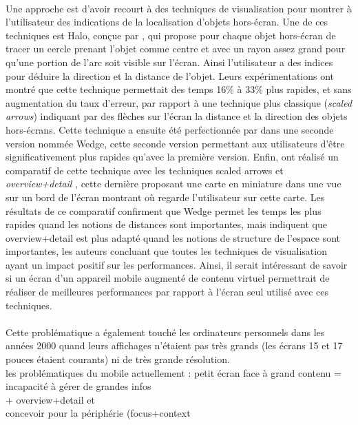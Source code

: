 \paragraph{}
Une approche est d'avoir recourt à des techniques de visualisation pour montrer à l'utilisateur des indications de la localisation d'objets hors-écran. Une de ces techniques est Halo, conçue par \citet{BaudischRosenholtz2003}, qui propose pour chaque objet hors-écran de tracer un cercle prenant l'objet comme centre et avec un rayon assez grand pour qu'une portion de l'arc soit visible sur l'écran. Ainsi l'utilisateur a des indices pour déduire la direction et la distance de l'objet. Leurs expérimentations ont montré que cette technique permettait des temps 16\% à 33\% plus rapides, et sans augmentation du taux d'erreur, par rapport à une technique plus classique (\emph{scaled arrows}) indiquant par des flèches sur l'écran la distance et la direction des objets hors-écrans. Cette technique a ensuite été perfectionnée par \citet{GustafsonBaudischGutwinEtAl2008} dans une seconde version nommée Wedge, cette seconde version permettant aux utilisateurs d'être significativement plus rapides qu'avec la première version. Enfin, \citet{BurigatChittaro2011} ont réalisé un comparatif de cette technique avec les techniques \foreignlanguage{english}{scaled arrows} et \emph{overview+detail} , cette dernière proposant une carte en miniature dans une vue sur un bord de l'écran montrant où regarde l'utilisateur sur cette carte. Les résultats de ce comparatif confirment que Wedge permet les temps les plus rapides quand les notions de distances sont importantes, mais indiquent que overview+detail est plus adapté quand les notions de structure de l'espace sont importantes, les auteurs concluant que toutes les techniques de visualisation ayant un impact positif sur les performances. Ainsi, il serait intéressant de savoir si un écran d'un appareil mobile augmenté de contenu virtuel permettrait de réaliser de meilleures performances par rapport à l'écran seul utilisé avec ces techniques.


\paragraph{}
Cette problématique a également touché les ordinateurs personnels dans les années 2000 quand leurs affichages n'étaient pas très grands (les écrans 15 et 17 pouces étaient courants) ni de très grande résolution.\\
les problématiques du mobile actuellement : petit écran face à grand contenu = incapacité à gérer de grandes infos\\
+ overview+detail \cite{BergeSerranoPerelmanEtAl2014} et \cite{RashidNacentaQuigley2012}\\
concevoir pour la périphérie (focus+context \cite{CockburnKarlsonBederson2009}

